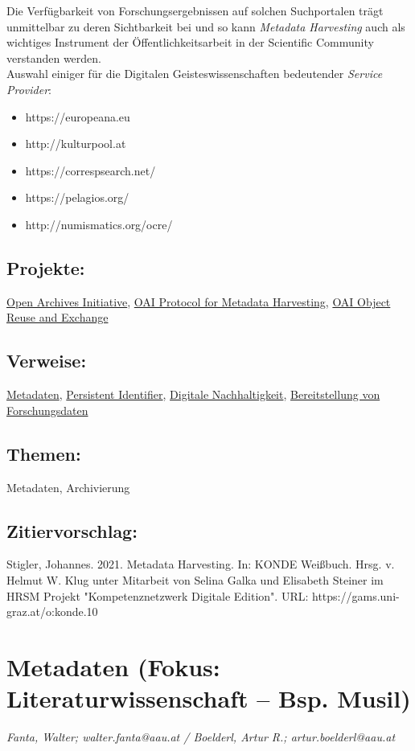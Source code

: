 \documentclass{article}
\begin{document}
        Die Verfügbarkeit von Forschungsergebnissen auf solchen Suchportalen trägt unmittelbar zu deren Sichtbarkeit bei und so kann \emph{Metadata Harvesting} auch als wichtiges Instrument der Öffentlichkeitsarbeit in der Scientific Community verstanden werden.	\\
            
        Auswahl einiger für die Digitalen Geisteswissenschaften bedeutender \emph{Service Provider}:\\
            
        \begin{itemize}\item {https://europeana.eu}\item {http://kulturpool.at}\item {https://correspsearch.net/}\item {https://pelagios.org/}\item {http://numismatics.org/ocre/}\end{itemize}\subsection*{Projekte:}\href{http://openarchives.org/}{Open Archives Initiative}, \href{http://openarchives.org/OAI/openarchivesprotocol.html}{OAI Protocol for Metadata Harvesting}, \href{http://openarchives.org/ore}{OAI Object Reuse and Exchange}\subsection*{Verweise:}\href{https://gams.uni-graz.at/o:konde.225}{Metadaten}, \href{https://gams.uni-graz.at/o:konde.12}{Persistent Identifier}, \href{https://gams.uni-graz.at/o:konde.6}{Digitale Nachhaltigkeit}, \href{https://gams.uni-graz.at/o:konde.87}{Bereitstellung von Forschungsdaten}\subsection*{Themen:}Metadaten, Archivierung\subsection*{Zitiervorschlag:}Stigler, Johannes. 2021. Metadata Harvesting. In: KONDE Weißbuch. Hrsg. v. Helmut W. Klug unter Mitarbeit von Selina Galka und Elisabeth Steiner im HRSM Projekt "Kompetenznetzwerk Digitale Edition". URL: https://gams.uni-graz.at/o:konde.10\newpage\section*{Metadaten (Fokus: Literaturwissenschaft – Bsp. Musil)} \emph{Fanta, Walter; walter.fanta@aau.at / Boelderl, Artur R.; artur.boelderl@aau.at }\\
        
\end{document}
